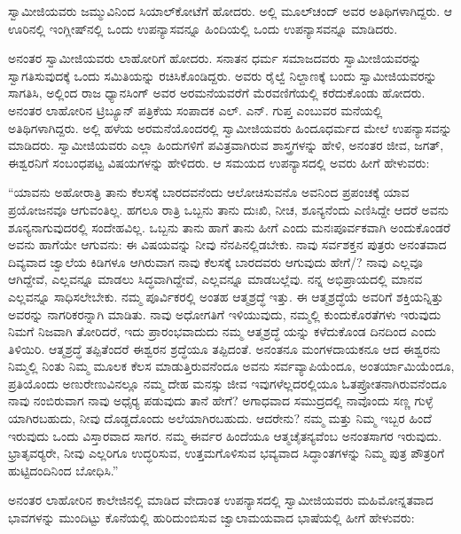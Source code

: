  ಸ್ವಾಮೀಜಿಯವರು ಜಮ್ಮುವಿನಿಂದ ಸಿಯಾಲ್‍ಕೋಟೆಗೆ ಹೋದರು. ಅಲ್ಲಿ ಮೂಲ್‍ಚಂದ್ ಅವರ ಅತಿಥಿಗಳಾಗಿದ್ದರು. ಆ ಊರಿನಲ್ಲಿ ಇಂಗ್ಲೀಷ್‍ನಲ್ಲಿ ಒಂದು ಉಪನ್ಯಾಸವನ್ನೂ ಹಿಂದಿಯಲ್ಲಿ ಒಂದು ಉಪನ್ಯಾಸವನ್ನೂ ಮಾಡಿದರು. 

 ಅನಂತರ ಸ್ವಾಮೀಜಿಯವರು ಲಾಹೋರಿಗೆ ಹೋದರು. ಸನಾತನ ಧರ್ಮ ಸಮಾಜದವರು ಸ್ವಾಮೀಜಿಯವರನ್ನು ಸ್ವಾಗತಿಸುವುದಕ್ಕೆ ಒಂದು ಸಮಿತಿಯನ್ನು ರಚಿಸಿಕೊಂಡಿದ್ದರು. ಅವರು ರೈಲ್ವೆ ನಿಲ್ದಾಣಕ್ಕೆ ಬಂದು ಸ್ವಾಮೀಜಿಯವರನ್ನು ಸಾಗತಿಸಿ, ಅಲ್ಲಿಂದ ರಾಜ ಧ್ಯಾನಸಿಂಗ್ ಅವರ ಅರಮನೆಯವರೆಗೆ ಮೆರವಣಿಗೆಯಲ್ಲಿ ಕರೆದುಕೊಂಡು ಹೋದರು. ಅನಂತರ ಲಾಹೋರಿನ ಟ್ರಿಬ್ಯೂನ್ ಪತ್ರಿಕೆಯ ಸಂಪಾದಕ ಎಲ್. ಎನ್. ಗುಪ್ತ ಎಂಬುವರ ಮನೆಯಲ್ಲಿ ಅತಿಥಿಗಳಾಗಿದ್ದರು. ಅಲ್ಲಿ ಹಳೆಯ ಅರಮನೆಯೊಂದರಲ್ಲಿ ಸ್ವಾಮೀಜಿಯವರು ಹಿಂದೂಧರ್ಮದ ಮೇಲೆ ಉಪನ್ಯಾಸವನ್ನು ಮಾಡಿದರು. ಸ್ವಾಮೀಜಿಯವರು ಎಲ್ಲಾ ಹಿಂದುಗಳಿಗೆ ಪವಿತ್ರವಾಗಿರುವ ಶಾಸ್ತ್ರಗಳನ್ನು ಹೇಳಿ, ಅನಂತರ ಜೀವ, ಜಗತ್, ಈಶ್ವರನಿಗೆ ಸಂಬಂಧಪಟ್ಟ ವಿಷಯಗಳನ್ನು ಹೇಳಿದರು. ಆ ಸಮಯದ ಉಪನ್ಯಾಸದಲ್ಲಿ ಅವರು ಹೀಗೆ ಹೇಳುವರು: 

 “ಯಾವನು ಅಹೋರಾತ್ರಿ ತಾನು ಕೆಲಸಕ್ಕೆ ಬಾರದವನೆಂದು ಆಲೋಚಿಸುವನೊ ಅವನಿಂದ ಪ್ರಪಂಚಕ್ಕೆ ಯಾವ ಪ್ರಯೋಜನವೂ ಆಗುವಂತಿಲ್ಲ. ಹಗಲೂ ರಾತ್ರಿ ಒಬ್ಬನು ತಾನು ದುಃಖಿ, ನೀಚ, ಶೂನ್ಯನೆಂದು ಎಣಿಸಿದ್ದೇ ಆದರೆ ಅವನು ಶೂನ್ಯನಾಗುವುದರಲ್ಲಿ ಸಂದೇಹವಿಲ್ಲ. ಒಬ್ಬನು ತಾನು ಹಾಗೆ ತಾನು ಹೀಗೆ ಎಂದು ಮನಃಪೂರ್ವಕವಾಗಿ ಅಂದುಕೊಂಡರೆ ಅವನು ಹಾಗೆಯೇ ಆಗುವನು: ಈ ವಿಷಯವನ್ನು ನೀವು ನೆನಪಿನಲ್ಲಿಡಬೇಕು. ನಾವು ಸರ್ವಶಕ್ತನ ಪುತ್ರರು ಅನಂತವಾದ ದಿವ್ಯವಾದ ಜ್ವಾಲೆಯ ಕಿಡಿಗಳೂ ಆಗಿರುವಾಗ ನಾವು ಕೆಲಸಕ್ಕೆ ಬಾರದವರು ಆಗುವುದು ಹೇಗೆ/? ನಾವು ಎಲ್ಲವೂ ಆಗಿದ್ದೇವೆ, ಎಲ್ಲವನ್ನೂ ಮಾಡಲು ಸಿದ್ಧವಾಗಿದ್ದೇವೆ, ಎಲ್ಲವನ್ನೂ ಮಾಡಬಲ್ಲೆವು. ನನ್ನ ಅಭಿಪ್ರಾಯದಲ್ಲಿ ಮಾನವ ಎಲ್ಲವನ್ನೂ ಸಾಧಿಸಲೇಬೇಕು. ನಮ್ಮ ಪೂರ್ವಿಕರಲ್ಲಿ ಅಂತಹ ಆತ್ಮಶ್ರದ್ಧೆ ಇತ್ತು. ಈ ಆತ್ಮಶ್ರದ್ಧೆಯೆ ಅವರಿಗೆ ಶಕ್ತಿಯನ್ನಿತ್ತು ಅವರನ್ನು ನಾಗರಿಕರನ್ನಾಗಿ ಮಾಡಿತು. ನಾವು ಅಧೋಗತಿಗೆ ಇಳಿಯುವುದು, ನಮ್ಮಲ್ಲಿ ಕುಂದುಕೊರತೆಗಳು ಇರುವುದು ನಿಮಗೆ ನಿಜವಾಗಿ ತೋರಿದರೆ, ಇದು ಪ್ರಾರಂಭವಾದುದು ನಮ್ಮ ಆತ್ಮಶ್ರದ್ಧೆ ಯನ್ನು ಕಳೆದುಕೊಂಡ ದಿನದಿಂದ ಎಂದು ತಿಳಿಯಿರಿ. ಆತ್ಮಶ್ರದ್ಧೆ ತಪ್ಪಿತೆಂದರೆ ಈಶ್ವರನ ಶ್ರದ್ಧೆಯೂ ತಪ್ಪಿದಂತೆ. ಅನಂತನೂ ಮಂಗಳದಾಯಕನೂ ಆದ ಈಶ್ವರನು ನಿಮ್ಮಲ್ಲಿ ನಿಂತು ನಿಮ್ಮ ಮೂಲಕ ಕೆಲಸ ಮಾಡುತ್ತಿರುವನೆಂದೂ ಅವನು ಸರ್ವವ್ಯಾಪಿಯೆಂದೂ, ಅಂತರ್ಯಾಮಿಯೆಂದೂ, ಪ್ರತಿಯೊಂದು ಅಣುರೇಣುವಿನಲ್ಲೂ ನಮ್ಮ ದೇಹ ಮನಸ್ಸು ಜೀವ ಇವುಗಳೆಲ್ಲದರಲ್ಲಿಯೂ ಓತಪ್ರೋತನಾಗಿರುವನೆಂದೂ ನಾವು ನಂಬಿರುವಾಗ ನಾವು ಅಧೈರ‍್ಯ ಪಡುವುದು ತಾನೆ ಹೇಗೆ? ಅಗಾಧವಾದ ಸಮುದ್ರದಲ್ಲಿ ನಾವೊಂದು ಸಣ್ಣ ಗುಳ್ಳೆ ಯಾಗಿರಬಹುದು, ನೀವು ದೊಡ್ಡದೊಂದು ಅಲೆಯಾಗಿರಬಹುದು. ಆದರೇನು? ನಮ್ಮ ಮತ್ತು ನಿಮ್ಮ ಇಬ್ಬರ ಹಿಂದೆ ಇರುವುದು ಒಂದು ವಿಸ್ತಾರವಾದ ಸಾಗರ. ನಮ್ಮ ಈರ್ವರ ಹಿಂದೆಯೂ ಆತ್ಮಚೈತನ್ಯವೆಂಬ ಅನಂತಸಾಗರ ಇರುವುದು. ಭ್ರಾತೃವರ‍್ಯರೇ, ನೀವು ಎಲ್ಲರಿಗೂ ಉದ್ಧರಿಸುವ, ಉತ್ತಮಗೊಳಿಸುವ ಭವ್ಯವಾದ ಸಿದ್ಧಾಂತಗಳನ್ನು ನಿಮ್ಮ ಪುತ್ರ ಪೌತ್ರರಿಗೆ ಹುಟ್ಟಿದಂದಿನಿಂದ ಬೋಧಿಸಿ.” 

 ಅನಂತರ ಲಾಹೋರಿನ ಕಾಲೇಜಿನಲ್ಲಿ ಮಾಡಿದ ವೇದಾಂತ ಉಪನ್ಯಾಸದಲ್ಲಿ ಸ್ವಾಮೀಜಿಯವರು ಮಹಿಮೋನ್ನತವಾದ ಭಾವಗಳನ್ನು ಮುಂದಿಟ್ಟು ಕೊನೆಯಲ್ಲಿ ಹುರಿದುಂಬಿಸುವ ಜ್ವಾಲಾಮಯವಾದ ಭಾಷೆಯಲ್ಲಿ ಹೀಗೆ ಹೇಳುವರು: 

